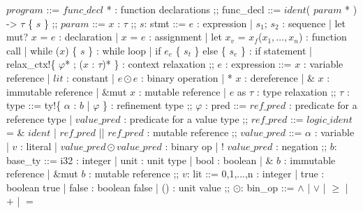 \documentclass[twoside, english]{sdqthesis}
\newcommand{\ccolon}[0]{: }
\newcommand{\cmid}[0]{| }
\newcommand{\cdisj}[0]{|| }
\theoremstyle{definition}
\begin{document}
\begin{bnfgrammar}
  $program$  ::=
    $func\_decl$ * : function declarations
  ;;
  func\_decl ::=
    $ident$( $param$ * ) -> $\tau$ \{ $s$ \}
  ;;
  $param$ ::= $x$ \ccolon  $\tau$
  ;;
  $s$: stmt 
  ::=
    $e$                                                   : expression
    | $s_1$; $s_2$                                        : sequence
    | let mut? $x$ = $e$                                  : declaration
    | $x$ = $e$                                           : assignment
    | let $x_v$ = $x_f$($x_1, \dots, x_n$)                : function call
    | while ($x$) \{ $s$ \}                               : while loop
    | if $e_c$ \{ $s_t$ \} else \{ $s_e$ \}               : if statement
    | relax\_ctx!\{ $\varphi$* ; ($x$ \ccolon $\tau$)* \} : context relaxation
  ;;
  $e$                                              : expression 
  ::=
    $x$                                         : variable reference
    | $lit$                                         : constant
    | $e \odot e$                                   : binary operation
    | * $x$                                     : dereference
    | \& $x$                                    : immutable reference
    | \&mut $x$                                 : mutable reference
    | $e$ as $\tau$                                : type relaxation
  ;;
  $\tau$ : type ::= ty!\{ $\alpha$ \ccolon $b$ \cmid $\varphi$ \} : refinement type
  ;;
  $\varphi$ : pred ::=
    $ref\_pred$                                     : predicate for a reference type
    | $value\_pred$                                 : predicate for a value type
  ;;
  $ref\_pred$ ::=
    $logic\_ident$ = \& $ident$
    | $ref\_pred$ \cdisj $ref\_pred$         : mutable reference
  ;;
  $value\_pred$ ::=
    $\alpha$                                 : variable
  | $v$                                      : literal
  | $value\_pred \odot value\_pred$          : binary op
  | ! $value\_pred$                          : negation
  ;;
  $b$: base\_ty ::=
    i32                     : integer
    | unit                  : unit type
    | bool                  : boolean
    | \& $b$                : immutable reference
    | \&mut $b$             : mutable reference
  ;;
  $v$: lit ::=
      0,1,...,n             : integer
    | true                  : boolean true
    | false                 : boolean false
    | ()                    : unit value
  ;;
  $\odot$: bin\_op ::= $\wedge$ | $\vee$ | $\geq$ | $+$ | $=$
\end{bnfgrammar}
\end{document}

